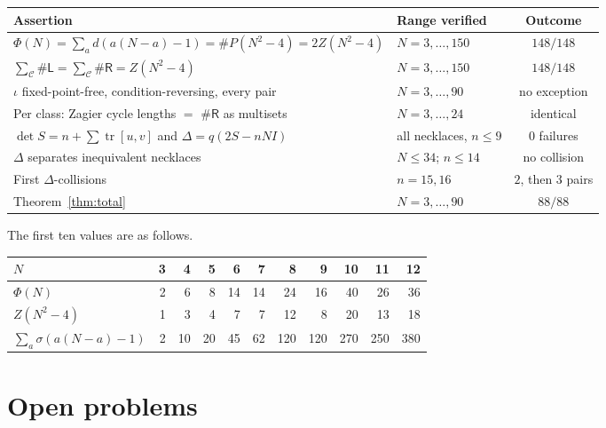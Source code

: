 \documentclass[11pt,reqno]{amsart}
\theoremstyle{plain}
\theoremstyle{definition}
\newcommand{\Ll}{\mathsf{L}}
\newcommand{\Rr}{\mathsf{R}}
\newcommand{\tr}{\operatorname{tr}}
\begin{document}
\begin{center}\small
\begin{tabular}{@{}llc@{}}
\toprule
Assertion & Range verified & Outcome\\
\midrule
$\Phi(N)=\sum_a d(a(N-a)-1)=\#P(N^2-4)=2Z(N^2-4)$ & $N=3,\dots,150$ & $148/148$\\
$\sum_\mathcal{C}\#\Ll=\sum_\mathcal{C}\#\Rr=Z(N^2-4)$ & $N=3,\dots,150$ & $148/148$\\
$\iota$ fixed-point-free, condition-reversing, every pair & $N=3,\dots,90$ & no exception\\
Per class: Zagier cycle lengths $=$ $\#\Rr$ as multisets & $N=3,\dots,24$ & identical\\
$\det S=n+\sum\tr[u,v]$ and $\Delta=q(2S-nNI)$ & all necklaces, $n\le9$ & $0$ failures\\
$\Delta$ separates inequivalent necklaces & $N\le34$; $n\le14$ & no collision\\
First $\Delta$-collisions & $n=15,16$ & $2$, then $3$ pairs\\
Theorem~\ref{thm:total} & $N=3,\dots,90$ & $88/88$\\
\bottomrule
\end{tabular}
\end{center}

\medskip
The first ten values are as follows.

\begin{center}
\begin{tabular}{@{}lrrrrrrrrrr@{}}
\toprule
$N$ & 3 & 4 & 5 & 6 & 7 & 8 & 9 & 10 & 11 & 12\\
\midrule
$\Phi(N)$ & 2 & 6 & 8 & 14 & 14 & 24 & 16 & 40 & 26 & 36\\
$Z(N^2-4)$ & 1 & 3 & 4 & 7 & 7 & 12 & 8 & 20 & 13 & 18\\
$\sum_a\sigma(a(N-a)-1)$ & 2 & 10 & 20 & 45 & 62 & 120 & 120 & 270 & 250 & 380\\
\bottomrule
\end{tabular}
\end{center}

\section{Open problems}\label{sec:open}
\end{document}

